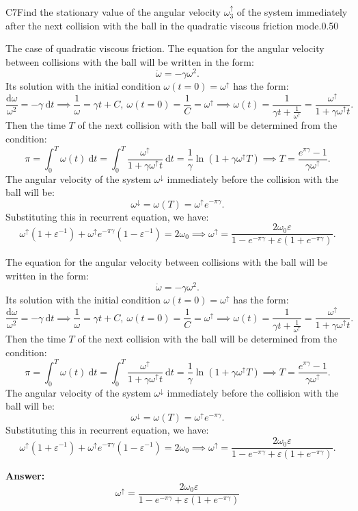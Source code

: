 \documentclass[11pt,a4paper]{article}
\begin{document}
\begin{solcard}{C7}{Find the stationary value of the angular velocity $\omega^\uparrow_3$ of the system immediately after the next collision with the ball in the quadratic viscous friction mode.}{0.50}

The case of quadratic viscous friction. The equation for the angular velocity between collisions with the ball will be written in the form:\[\dot\omega=-\gamma\omega^2.\]Its solution with the initial condition $\omega(t=0)=\omega^\uparrow$ has the form:\[\frac{\mathrm d\omega}{\omega^2}=-\gamma~\mathrm dt\implies\frac1\omega=\gamma t+C,~\omega(t=0)=\frac1C=\omega^\uparrow\implies\omega(t)=\frac1{\gamma t+\frac1{\omega^\uparrow}}=\frac{\omega^\uparrow}{1+\gamma\omega^\uparrow t}.\]Then the time $T$ of the next collision with the ball will be determined from the condition:\[\pi=\int_0^T\omega(t)~\mathrm dt=\int_0^T\frac{\omega^\uparrow}{1+\gamma\omega^\uparrow t}~\mathrm dt=\frac1\gamma\ln\left(1+\gamma\omega^\uparrow T\right)\implies T=\frac{e^{\pi\gamma}-1}{\gamma\omega^\uparrow}.\]The angular velocity of the system $\omega^\downarrow$ immediately before the collision with the ball will be:\[\omega^\downarrow=\omega(T)=\omega^\uparrow e^{-\pi\gamma}.\]Substituting this in recurrent equation, we have:\[\omega^\uparrow\left(1+\varepsilon^{-1}\right)+\omega^\uparrow e^{-\pi\gamma}\left(1-\varepsilon^{-1}\right)=2\omega_0\implies\omega^\uparrow=\frac{2\omega_0\varepsilon}{1-e^{-\pi\gamma}+\varepsilon\left(1+e^{-\pi\gamma}\right)}.\]


The equation for the angular velocity between collisions with the ball will be written in the form:\[\dot\omega=-\gamma\omega^2.\]Its solution with the initial condition $\omega(t=0)=\omega^\uparrow$ has the form:\[\frac{\mathrm d\omega}{\omega^2}=-\gamma~\mathrm dt\implies\frac1\omega=\gamma t+C,~\omega(t=0)=\frac1C=\omega^\uparrow\implies\omega(t)=\frac1{\gamma t+\frac1{\omega^\uparrow}}=\frac{\omega^\uparrow}{1+\gamma\omega^\uparrow t}.\]Then the time $T$ of the next collision with the ball will be determined from the condition:\[\pi=\int_0^T\omega(t)~\mathrm dt=\int_0^T\frac{\omega^\uparrow}{1+\gamma\omega^\uparrow t}~\mathrm dt=\frac1\gamma\ln\left(1+\gamma\omega^\uparrow T\right)\implies T=\frac{e^{\pi\gamma}-1}{\gamma\omega^\uparrow}.\]The angular velocity of the system $\omega^\downarrow$ immediately before the collision with the ball will be:\[\omega^\downarrow=\omega(T)=\omega^\uparrow e^{-\pi\gamma}.\]Substituting this in recurrent equation, we have:\[\omega^\uparrow\left(1+\varepsilon^{-1}\right)+\omega^\uparrow e^{-\pi\gamma}\left(1-\varepsilon^{-1}\right)=2\omega_0\implies\omega^\uparrow=\frac{2\omega_0\varepsilon}{1-e^{-\pi\gamma}+\varepsilon\left(1+e^{-\pi\gamma}\right)}.\]

\par\smallskip\noindent\textbf{Answer:} \[\omega^\uparrow=\frac{2\omega_0\varepsilon}{1-e^{-\pi\gamma}+\varepsilon\left(1+e^{-\pi\gamma}\right)}\]
\end{solcard}
\end{document}
